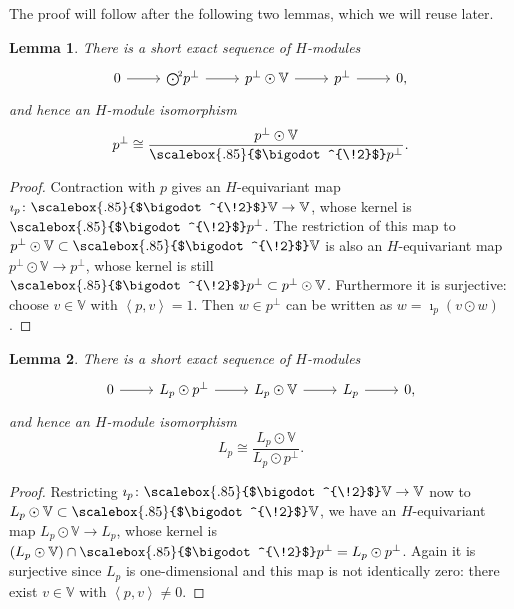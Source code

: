 \documentclass[11pt,reqno,a4paper,final]{amsart}
\newcommand\sym[1]{\scalebox{.85}{$\bigodot^{\!#1}$}}
\theoremstyle{plain}
\newtheorem{lemma}{Lemma}
\theoremstyle{definition}
\newcommand{\VV}{\mathbb{V}}
\newcommand{\1}{\mathbb{1}}
\numberwithin{equation}{section}
\begin{document}
The proof will follow after the following two lemmas, which we will
reuse later.

\begin{lemma}
  \label{lem:SES-1-for-H2rel}
  There is a short exact sequence of $H$-modules
  \begin{equation}
    \begin{tikzcd}
      0 \arrow[r] & \sym{2}p^\perp \arrow[r] & p^\perp \odot \VV \arrow[r] & p^\perp \arrow[r] & 0,
    \end{tikzcd}
  \end{equation}
  and hence an $H$-module isomorphism
  \begin{equation}
    p^\perp \cong \dfrac{p^\perp\odot \VV}{\sym{2}p^\perp}.
  \end{equation}
\end{lemma}

\begin{proof}
  Contraction with $p$ gives an $H$-equivariant map $\imath_p \colon
  \sym{2} \VV \to \VV$, whose kernel is $\sym{2} p^\perp$.  The
  restriction of this map to $p^\perp \odot \VV \subset \sym{2} \VV$
  is also an $H$-equivariant map $p^\perp \odot \VV \to p^\perp$,
  whose kernel is still $\sym{2} p^\perp \subset p^\perp \odot \VV$.
  Furthermore it is surjective: choose $v \in \VV$ with
  $\left<p,v\right>=1$.  Then $w \in p^\perp$ can be written as
  $w = \imath_p(v \odot w)$.
\end{proof}

\begin{lemma}
  \label{lem:SES-2-for-H2rel}
  There is a short exact sequence of $H$-modules
  \begin{equation}
    \begin{tikzcd}
      0 \arrow[r] & L_p \odot p^\perp \arrow[r] & L_p \odot \VV \arrow[r] & L_p \arrow[r] & 0,
    \end{tikzcd}
  \end{equation}
  and hence an $H$-module isomorphism
  \begin{equation}
    L_p \cong \dfrac{L_p\odot \VV}{L_p \odot p^\perp}.
  \end{equation}
\end{lemma}

\begin{proof}
  Restricting $\imath_p \colon \sym{2} \VV \to \VV$ now to $L_p \odot
  \VV \subset \sym{2} \VV$, we have an $H$-equivariant map $L_p \odot
  \VV \to L_p$, whose kernel is $\left( L_p \odot \VV\right) \cap
  \sym{2} p^\perp = L_p \odot p^\perp$.  Again it is surjective since
  $L_p$ is one-dimensional and this map is not identically zero: there
  exist $v \in \VV$ with $\left<p,v\right> \neq 0$.
\end{proof}
\end{document}
